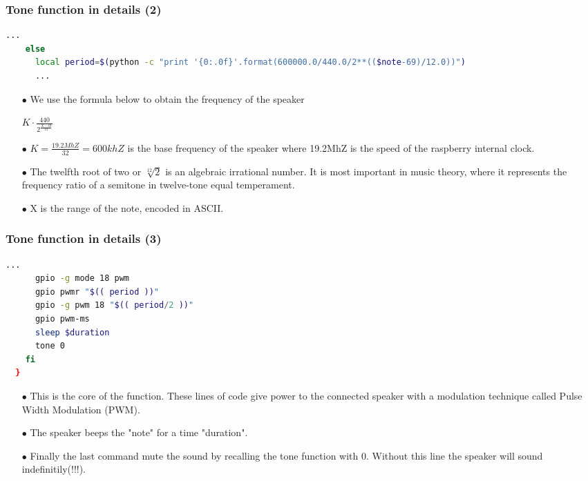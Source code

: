 \documentclass{beamer}
\begin{document}

\begin{frame}[fragile]
	\frametitle{\textbf{Tone function in details (2)}}
  \begin{lstlisting}[language=bash]
    ...
    else
      local period=$(python -c "print '{0:.0f}'.format(600000.0/440.0/2**(($note-69)/12.0))")
      ...
  \end{lstlisting}
  \begin{itemize}
  	\item[$\bullet$] We use the formula below to obtain the frequency of the speaker
  	
  	\begin{center}
  			$K\cdot\frac{440}{2^{\frac{X-69}{12}}}$
  	\end{center}
  		
  	
  	\item[$\bullet$] $K =\frac{19.2MhZ}{32} = 600khZ$ is the base frequency of the speaker where 19.2MhZ is the speed of the raspberry internal clock.
  	\item[$\bullet$] The twelfth root of two or $\sqrt[12]{2}$ is an algebraic irrational number. It is most important in music theory, where it represents the frequency ratio of a semitone in twelve-tone equal temperament.
  	\item[$\bullet$] X is the range of the note, encoded in ASCII.
  \end{itemize}
\end{frame}



\begin{frame}[fragile]
	\frametitle{\textbf{Tone function in details (3)}}
  \begin{lstlisting}[language=bash]
      ...
      gpio -g mode 18 pwm
      gpio pwmr "$(( period ))"
      gpio -g pwm 18 "$(( period/2 ))"
      gpio pwm-ms
      sleep $duration
      tone 0
    fi
  }
  \end{lstlisting}
  \begin{itemize}
  \item[$\bullet$] This is the core of the function. These lines of code give power to the connected speaker with a modulation technique called Pulse Width Modulation (PWM).
  \item[$\bullet$] The speaker beeps the "note" for a time "duration".
  \item[$\bullet$] Finally the last command mute the sound by recalling the tone function with 0. Without this line the speaker will sound indefinitily(!!!).
  \end{itemize}
\end{frame}
\end{document}
